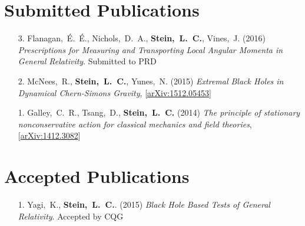 \newcommand{\arxiv}[1]{[\href{http://arxiv.org/abs/#1}{arXiv:#1}]}


\section{\sc Submitted Publications}
\begin{enumerate}
\item[{3.}]
  Flanagan,~\'E.~\'E., Nichols,~D.~A., {\bf Stein,~L.~C.}, Vines,~J.
  (2016)
  {\it Prescriptions for Measuring and Transporting Local Angular Momenta in General Relativity}.
  Submitted to PRD
\item[{2.}]
  McNees,~R., {\bf Stein,~L.~C.}, Yunes,~N.
  (2015)
  {\it Extremal Black Holes in Dynamical Chern-Simons Gravity},
  \arxiv{1512.05453}
\item[{1.}] Galley,~C.~R., Tsang,~D., {\bf Stein,~L.~C.} (2014)
  {\it The principle of stationary nonconservative action for
    classical mechanics and field theories},
  \arxiv{1412.3082}
\end{enumerate}

\section{\sc Accepted Publications}
\begin{enumerate}
\item[{1.}] Yagi,~K., {\bf Stein,~L.~C.}. (2015)
  {\it Black Hole Based Tests of General Relativity}.
  Accepted by CQG
\end{enumerate}

